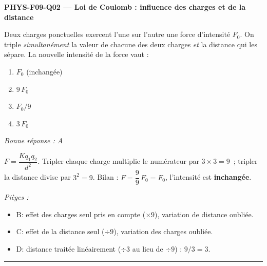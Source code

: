 \documentclass[11pt,a4paper]{article}
\begin{document}
\noindent\textbf{PHYS-F09-Q02 --- Loi de Coulomb : influence des charges et de la distance}\par
Deux charges ponctuelles exercent l'une sur l'autre une force d'intensité $F_0$. On triple \emph{simultanément} la valeur de chacune des deux charges \emph{et} la distance qui les sépare. La nouvelle intensité de la force vaut :
\begin{enumerate}[label=\Alph*)]
\item $F_0$ (inchangée)
\item $9\,F_0$
\item $F_0/9$
\item $3\,F_0$
\end{enumerate}
\textit{Bonne réponse : A}\par
$F=\dfrac{K q_1 q_2}{d^{2}}$. Tripler chaque charge multiplie le numérateur par $3\times 3=9$~; tripler la distance divise par $3^{2}=9$. Bilan : $F=\dfrac{9}{9}\,F_0=F_0$, l'intensité est \textbf{inchangée}.\par
\textit{Pièges :}
\begin{itemize}
\item B: effet des charges seul pris en compte ($\times 9$), variation de distance oubliée.
\item C: effet de la distance seul ($\div 9$), variation des charges oubliée.
\item D: distance traitée linéairement ($\div 3$ au lieu de $\div 9$) : $9/3=3$.
\end{itemize}
\vspace{8pt}\hrule\vspace{8pt}
\end{document}
